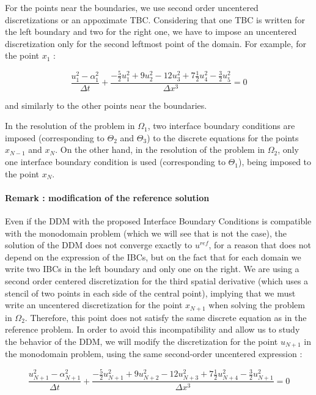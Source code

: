 \indent For the points near the boundaries, we use second order uncentered discretizations or an appoximate TBC. Considering that one TBC is written for the left boundary and two for the right one, we have to impose an uncentered discretization only for the second leftmost point of the domain. For example, for the point $x_1$ : 

\begin{equation}
    \label{eq:uncenteredFDdiscretization0}
    \frac{u_{1}^2 - \alpha_{1}^2}{\Delta t} + \frac{-\frac{5}{2}u_{1}^2 + 9u_{2}^2 - 12 u_{3}^2 + 7\frac{1}{2}u_{4}^2 -\frac{3}{2}u_{5}^2}{\Delta x ^3} = 0
\end{equation}

\noindent and similarly to the other points near the boundaries.

\indent In the resolution of the problem in $\Omega_1$, two interface boundary conditions are imposed (corresponding to $\Theta_2$ and $\Theta_3$) to the discrete equations for the points $x_{N-1}$ and $x_N$. On the other hand, in the resolution of the problem in $\Omega_2$, only one interface boundary condition is used (corresponding to $\Theta_1$), being imposed to the point $x_N$.

\paragraph{Remark : modification of the reference solution}

\indent  Even if the DDM with the proposed Interface Boundary Conditions is compatible with the monodomain problem (which we will see that is not the case), the solution of the DDM does not converge exactly to $u^{ref}$, for a reason that does not depend on the expression of the IBCs, but on the fact that for each domain we write two IBCs in the left boundary and only one on the right. We are using a second order centered discretization for the third spatial derivative (which uses a stencil of two points in each side of the central point), implying that we must write an uncentered discretization for the point $x_{N+1}$ when solving the problem in $\Omega_2$. Therefore, this point does not satisfy the same discrete equation as in the reference problem. In order to avoid this incompatibility and allow us to study the behavior of the DDM, we will modify the discretization for the point $u_{N+1}$ in the monodomain problem, using the same second-order uncentered expression :

\begin{equation*}
    \label{eq:uncenteredFDdiscretizationN}
    \frac{u_{N+1}^2 - \alpha_{N+1}^2}{\Delta t} + \frac{-\frac{5}{2}u_{N+1}^2 + 9u_{N+2}^2 - 12 u_{N+3}^2 + 7\frac{1}{2}u_{N+4}^2 -\frac{3}{2}u_{N+1}^2}{\Delta x ^3} = 0
\end{equation*}

